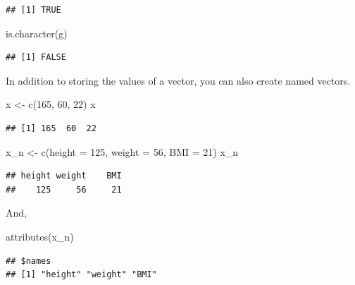 \documentclass[
]{book}
\newenvironment{Shaded}{\begin{snugshade}}{\end{snugshade}}
\newcommand{\AttributeTok}[1]{\textcolor[rgb]{0.77,0.63,0.00}{#1}}
\newcommand{\DecValTok}[1]{\textcolor[rgb]{0.00,0.00,0.81}{#1}}
\newcommand{\FunctionTok}[1]{\textcolor[rgb]{0.00,0.00,0.00}{#1}}
\newcommand{\NormalTok}[1]{#1}
\newcommand{\OtherTok}[1]{\textcolor[rgb]{0.56,0.35,0.01}{#1}}
\theoremstyle{definition}
\theoremstyle{definition}
\theoremstyle{definition}
\theoremstyle{definition}
\theoremstyle{remark}
\begin{document}
\begin{verbatim}
## [1] TRUE
\end{verbatim}

\begin{Shaded}
\begin{Highlighting}[]
\FunctionTok{is.character}\NormalTok{(g)}
\end{Highlighting}
\end{Shaded}

\begin{verbatim}
## [1] FALSE
\end{verbatim}

In addition to storing the values of a vector, you can also create named vectors.

\begin{Shaded}
\begin{Highlighting}[]
\NormalTok{x }\OtherTok{\textless{}{-}} \FunctionTok{c}\NormalTok{(}\DecValTok{165}\NormalTok{, }\DecValTok{60}\NormalTok{, }\DecValTok{22}\NormalTok{)}
\NormalTok{x}
\end{Highlighting}
\end{Shaded}

\begin{verbatim}
## [1] 165  60  22
\end{verbatim}

\begin{Shaded}
\begin{Highlighting}[]
\NormalTok{x\_n }\OtherTok{\textless{}{-}} \FunctionTok{c}\NormalTok{(}\AttributeTok{height =} \DecValTok{125}\NormalTok{, }\AttributeTok{weight =} \DecValTok{56}\NormalTok{, }\AttributeTok{BMI =} \DecValTok{21}\NormalTok{)}
\NormalTok{x\_n}
\end{Highlighting}
\end{Shaded}

\begin{verbatim}
## height weight    BMI 
##    125     56     21
\end{verbatim}

And,

\begin{Shaded}
\begin{Highlighting}[]
\FunctionTok{attributes}\NormalTok{(x\_n)}
\end{Highlighting}
\end{Shaded}

\begin{verbatim}
## $names
## [1] "height" "weight" "BMI"
\end{verbatim}
\end{document}
